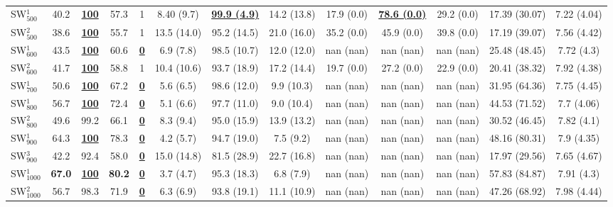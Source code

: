 \documentclass[a4paper,authoryear,review]{elsarticle}
\begin{document}
\begin{table}[]
\begin{adjustbox}{angle=90}
{\begin{tabular}{lcccccccccccc}
					SW$_{500}^{1}$ & 40.2 & {\ul \textbf{100}} & 57.3 & 1 & 8.40 (9.7) & {\ul \textbf{99.9 (4.9)}} & 14.2 (13.8) & 17.9 (0.0) & {\ul \textbf{78.6 (0.0)}} & 29.2 (0.0) & 17.39 (30.07) & 7.22 (4.04) \\
					SW$_{500}^{2}$ & 38.6 & {\ul \textbf{100}} & 55.7 & 1 & 13.5 (14.0) & 95.2 (14.5) & 21.0 (16.0) & 35.2 (0.0) & 45.9 (0.0) & 39.8 (0.0) & 17.19 (39.07) & 7.56 (4.42) \\
					SW$_{600}^{1}$ & 43.5 & {\ul \textbf{100}} & 60.6 & {\ul \textbf{0}} & 6.9 (7.8) & 98.5 (10.7) & 12.0 (12.0) & nan (nan) & nan (nan) & nan (nan) & 25.48 (48.45) & 7.72 (4.3) \\
					SW$_{600}^{2}$ & 41.7 & {\ul \textbf{100}} & 58.8 & 1 & 10.4 (10.6) & 93.7 (18.9) & 17.2 (14.4) & 19.7 (0.0) & 27.2 (0.0) & 22.9 (0.0) & 20.41 (38.32) & 7.92 (4.38) \\
					SW$_{700}^{1}$ & 50.6 & {\ul \textbf{100}} & 67.2 & {\ul \textbf{0}} & 5.6 (6.5) & 98.6 (12.0) & 9.9 (10.3) & nan (nan) & nan (nan) & nan (nan) & 31.95 (64.36) & 7.75 (4.45) \\
					SW$_{800}^{1}$ & 56.7 & {\ul \textbf{100}} & 72.4 & {\ul \textbf{0}} & 5.1 (6.6) & 97.7 (11.0) & 9.0 (10.4) & nan (nan) & nan (nan) & nan (nan) & 44.53 (71.52) & 7.7 (4.06) \\
					SW$_{800}^{2}$ & 49.6 & 99.2 & 66.1 & {\ul \textbf{0}} & 8.3 (9.4) & 95.0 (15.9) & 13.9 (13.2) & nan (nan) & nan (nan) & nan (nan) & 30.52 (46.45) & 7.82 (4.1) \\
					SW$_{900}^{1}$ & 64.3 & {\ul \textbf{100}} & 78.3 & {\ul \textbf{0}} & 4.2 (5.7) & 94.7 (19.0) & 7.5 (9.2) & nan (nan) & nan (nan) & nan (nan) & 48.16 (80.31) & 7.9 (4.35) \\
					SW$_{900}^{3}$ & 42.2 & 92.4 & 58.0 & {\ul \textbf{0}} & 15.0 (14.8) & 81.5 (28.9) & 22.7 (16.8) & nan (nan) & nan (nan) & nan (nan) & 17.97 (29.56) & 7.65 (4.67) \\
					SW$_{1000}^{1}$ & \textbf{67.0} & {\ul \textbf{100}} & \textbf{80.2} & {\ul \textbf{0}} & 3.7 (4.7) & 95.3 (18.3) & 6.8 (7.9) & nan (nan) & nan (nan) & nan (nan) & 57.83 (84.87) & 7.91 (4.3) \\
					SW$_{1000}^{2}$ & 56.7 & 98.3 & 71.9 & {\ul \textbf{0}} & 6.3 (6.9) & 93.8 (19.1) & 11.1 (10.9) & nan (nan) & nan (nan) & nan (nan) & 47.26 (68.92) & 7.98 (4.44) \\ \hline
				\end{tabular}     
			}
		\end{adjustbox}
		\caption{
}
\end{table}
\end{document}
